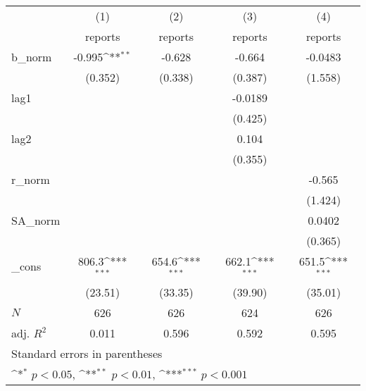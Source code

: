{
\def\sym#1{\ifmmode^{#1}\else\(^{#1}\)\fi}
\begin{tabular}{l*{4}{c}}
\hline\hline
            &\multicolumn{1}{c}{(1)}&\multicolumn{1}{c}{(2)}&\multicolumn{1}{c}{(3)}&\multicolumn{1}{c}{(4)}\\
            &\multicolumn{1}{c}{reports}&\multicolumn{1}{c}{reports}&\multicolumn{1}{c}{reports}&\multicolumn{1}{c}{reports}\\
\hline
b\_norm      &      -0.995\sym{**} &      -0.628         &      -0.664         &     -0.0483         \\
            &     (0.352)         &     (0.338)         &     (0.387)         &     (1.558)         \\
[1em]
lag1        &                     &                     &     -0.0189         &                     \\
            &                     &                     &     (0.425)         &                     \\
[1em]
lag2        &                     &                     &       0.104         &                     \\
            &                     &                     &     (0.355)         &                     \\
[1em]
r\_norm      &                     &                     &                     &      -0.565         \\
            &                     &                     &                     &     (1.424)         \\
[1em]
SA\_norm     &                     &                     &                     &      0.0402         \\
            &                     &                     &                     &     (0.365)         \\
[1em]
\_cons      &       806.3\sym{***}&       654.6\sym{***}&       662.1\sym{***}&       651.5\sym{***}\\
            &     (23.51)         &     (33.35)         &     (39.90)         &     (35.01)         \\
\hline
\(N\)       &         626         &         626         &         624         &         626         \\
adj. \(R^{2}\)&       0.011         &       0.596         &       0.592         &       0.595         \\
\hline\hline
\multicolumn{5}{l}{\footnotesize Standard errors in parentheses}\\
\multicolumn{5}{l}{\footnotesize \sym{*} \(p<0.05\), \sym{**} \(p<0.01\), \sym{***} \(p<0.001\)}\\
\end{tabular}
}
